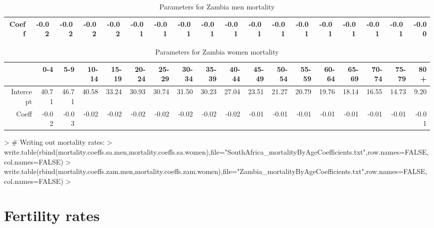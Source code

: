 \documentclass{article}
\begin{document}
\begin{landscape}
\begin{table}[ht]
\begin{tabular}{rrrrrrrrrrrrrrrrrr}
  Coeff & -0.02 & -0.02 & -0.02 & -0.02 & -0.01 & -0.01 & -0.01 & -0.01 & -0.01 & -0.01 & -0.01 & -0.01 & -0.01 & -0.01 & -0.01 & -0.01 & -0.00 \\ 
   \hline
\end{tabular}
\endgroup
\caption{Parameters for Zambia men mortality} 
\end{table}%
\begin{table}[ht]
\centering
\begingroup\small
\begin{tabular}{rrrrrrrrrrrrrrrrrr}
  \hline
 & 0-4 & 5-9 & 10-14 & 15-19 & 20-24 & 25-29 & 30-34 & 35-39 & 40-44 & 45-49 & 50-54 & 55-59 & 60-64 & 65-69 & 70-74 & 75-79 & 80+ \\ 
  \hline
Intercept & 40.71 & 46.71 & 40.58 & 33.24 & 30.93 & 30.74 & 31.50 & 30.23 & 27.04 & 23.51 & 21.27 & 20.79 & 19.76 & 18.14 & 16.55 & 14.73 & 9.20 \\ 
  Coeff & -0.02 & -0.03 & -0.02 & -0.02 & -0.02 & -0.02 & -0.02 & -0.02 & -0.02 & -0.01 & -0.01 & -0.01 & -0.01 & -0.01 & -0.01 & -0.01 & -0.01 \\ 
   \hline
\end{tabular}
\endgroup
\caption{Parameters for Zambia women mortality} 
\end{table}

\end{landscape}


%
\begin{Schunk}
\begin{Sinput}
> # Writing out mortality rates:
> write.table(rbind(mortality.coeffs.sa.men,mortality.coeffs.sa.women),file="SouthAfrica_mortalityByAgeCoefficients.txt",row.names=FALSE,col.names=FALSE)
> write.table(rbind(mortality.coeffs.zam.men,mortality.coeffs.zam.women),file="Zambia_mortalityByAgeCoefficients.txt",row.names=FALSE,col.names=FALSE)
> 
\end{Sinput}
\end{Schunk}

\clearpage

\section*{Fertility rates}
\end{document}
